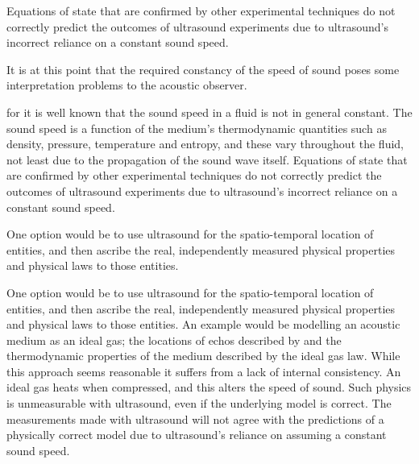 Equations of state that are confirmed by other experimental techniques do not correctly predict the outcomes of ultrasound experiments
due to ultrasound's incorrect reliance on a constant sound speed.


It is at this point that the required constancy of the speed of sound poses some interpretation problems to the acoustic observer.




for it is well known that the sound speed in a fluid is not in general constant.
The sound speed is a function of the medium's thermodynamic quantities such as  density, pressure, temperature and entropy,
and these vary throughout the fluid, not least due to the propagation of the sound wave itself.
Equations of state that are confirmed by other experimental techniques do not correctly predict the outcomes of ultrasound experiments
due to ultrasound's incorrect reliance on a constant sound speed.






One option would be to use ultrasound for the spatio-temporal location of entities, and then ascribe the real, independently measured physical properties and physical laws to those entities.



One option would be to use ultrasound for the spatio-temporal location of entities, and then ascribe the real, independently measured physical properties and physical laws to those entities.
An example would be modelling an acoustic medium as an ideal gas; the locations of echos described by  and the thermodynamic properties of the medium described by the ideal gas law.
While this approach seems reasonable it suffers from a lack of internal consistency. 
An ideal gas heats when compressed, and this alters the speed of sound.  
Such physics is unmeasurable with ultrasound, even if the underlying model is correct.
The measurements made with ultrasound will not agree with the predictions of a physically correct model due to ultrasound's reliance on assuming a constant sound speed.



